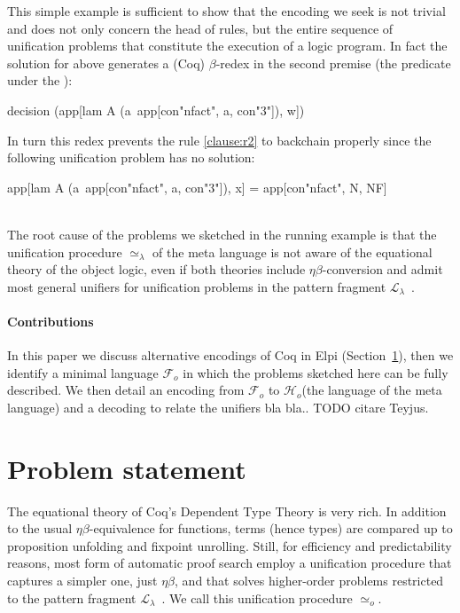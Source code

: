 \documentclass[sigconf,natbib=false,review]{acmart}
\newcommand{\UnifRel}{\ensuremath{\simeq}}
\newcommand{\Uo}{\ensuremath{\UnifRel_o}\xspace}
\newcommand{\Ue}{\ensuremath{\UnifRel_\lambda}\xspace}
\newcommand{\llambda}{\ensuremath{\mathcal{L}_\lambda}\xspace}
\newcommand{\Fo}{\ensuremath{\mathcal{F}_{\!o}\xspace}} %
\newcommand{\Ho}{\ensuremath{\mathcal{H}_o}\xspace}
\begin{document}
\noindent
This simple example is sufficient to show that the encoding we seek
is not trivial and does not only concern the head of rules, but the entire sequence
of unification problems that constitute the execution of a logic program.
In fact
the solution for  above generates a
(Coq) $\beta$-redex in the second premise (the predicate
under the \hspace{-0.4em}):

\begin{elpicode}
decision (app[lam A (a\ app[con"nfact", a, con"3"]), w])
\end{elpicode}

\noindent
In turn this redex prevents the rule \ref{clause:r2} to backchain properly since
the following unification problem has no solution:

\begin{elpicode}
app[lam A (a\ app[con"nfact", a, con"3"]), x] =
app[con"nfact", N, NF]
\end{elpicode}
\noindent
~\\
The root cause of the problems we sketched in the running example
is that the unification procedure \Ue of the meta language is not aware
of the equational theory of the object logic, even if both theories
include $\eta\beta$-conversion and admit most general
unifiers for unification problems in the pattern fragment \llambda~\cite{miller92jsc}.

\paragraph{Contributions}
In this paper we discuss alternative encodings of Coq in
Elpi (Section~\ref{sec:encodings}), then we identify a minimal language \Fo{}
in which the problems sketched here can be fully described.
We then detail an encoding  from \Fo{} to \Ho (the language of
the meta language) and a decoding  to relate the unifiers
bla bla.. TODO citare Teyjus.

\section{Problem statement} %
\label{sec:encodings}

The equational theory of Coq's Dependent Type Theory is very rich. In
addition to the usual $\eta\beta$-equivalence for functions, terms (hence types)
are compared up to proposition unfolding and fixpoint unrolling. Still,
for efficiency and predictability reasons, most form of automatic proof search
employ a unification procedure that captures a simpler one,
just $\eta\beta$, and that solves higher-order problems
restricted to the pattern fragment $\llambda$~\cite{miller92jsc}.
We call this unification procedure \Uo{}.
\end{document}
